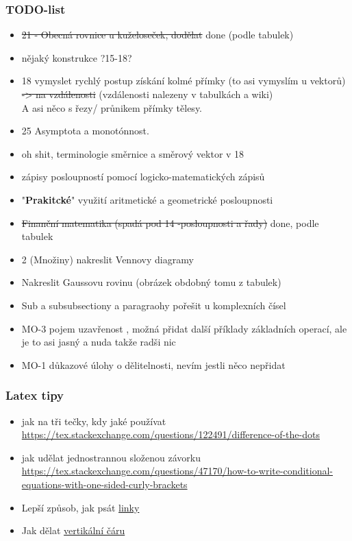\documentclass[12pt]{article}
\begin{document}
\subsubsection{TODO-list}
\begin{itemize}
\item  \st{21 - Obecná rovnice u kuželoseček, dodělat} done (podle tabulek)
\item nějaký konstrukce ?15-18?
\item 18 vymyslet rychlý postup získání kolmé přímky (to asi vymyslím u vektorů)  \st{-> na vzdálenosti} (vzdálenosti nalezeny v tabulkách a wiki)\\ A asi něco s řezy/ průnikem přímky tělesy.
\item 25 Asymptota a monotónnost.
\item oh shit, terminologie směrnice a směrový vektor v 18
\item zápisy posloupností pomocí logicko-matematických zápisů
\item "\textbf{Prakitcké}" využití aritmetické a geometrické posloupnosti
\item \st{Finanční matematika (spadá pod 14 -posloupnosti a řady)} done, podle tabulek
\item 2 (Množiny) nakreslit Vennovy diagramy
\item Nakreslit Gaussovu rovinu (obrázek obdobný tomu z tabulek)
\item Sub a subsubsectiony a paragraohy pořešit u komplexních čísel
\item MO-3 pojem uzavřenost , možná přidat další příklady základních operací, ale je to asi jasný a nuda takže radši nic
\item MO-1 důkazové úlohy o dělitelnosti, nevím jestli něco nepřidat
\end{itemize}
\subsubsection{Latex tipy}
\begin{itemize}
\item jak na tři tečky, kdy jaké používat \url{https://tex.stackexchange.com/questions/122491/difference-of-the-dots}
\item jak udělat jednostrannou složenou závorku \url{https://tex.stackexchange.com/questions/47170/how-to-write-conditional-equations-with-one-sided-curly-brackets}
\item Lepší způsob, jak psát \href{https://www.latex-tutorial.com/tutorials/hyperlinks/}{linky}
\item Jak dělat \href{https://tex.stackexchange.com/questions/498/mid-vertical-bar-vert-lvert-rvert-divides}{vertikální čáru}
\end{itemize}
\end{document}
